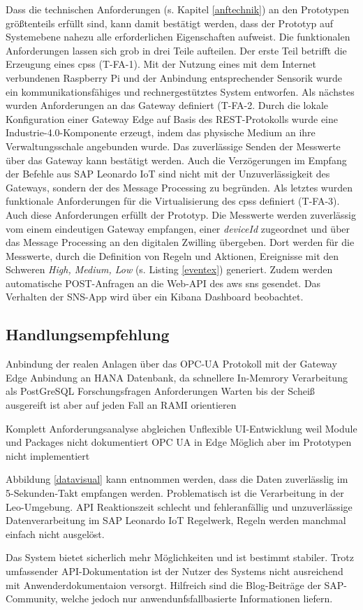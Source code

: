 Dass die technischen Anforderungen (s. Kapitel \ref{anftechnik}) an den Prototypen größtenteils erfüllt sind, kann damit bestätigt werden, dass der Prototyp auf Systemebene nahezu alle erforderlichen Eigenschaften aufweist. Die funktionalen Anforderungen lassen sich grob in drei Teile aufteilen. Der erste Teil betrifft die Erzeugung eines \ac{cpss} (T-FA-1). Mit der Nutzung eines mit dem Internet verbundenen Raspberry Pi und der Anbindung entsprechender Sensorik wurde ein kommunikationsfähiges und rechnergestütztes System entworfen. Als nächstes wurden Anforderungen an das Gateway definiert  (T-FA-2. Durch die lokale Konfiguration einer Gateway Edge auf Basis des REST-Protokolls wurde eine Industrie-4.0-Komponente erzeugt, indem das physische Medium an ihre Verwaltungsschale angebunden wurde. Das zuverlässige Senden der Messwerte über das Gateway kann bestätigt werden. Auch die Verzögerungen im Empfang der Befehle aus SAP Leonardo IoT sind nicht mit der Unzuverlässigkeit des Gateways, sondern der des Message Processing zu begründen. Als letztes wurden funktionale Anforderungen für die Virtualisierung des \ac{cpss} definiert (T-FA-3). Auch diese Anforderungen erfüllt der Prototyp. Die Messwerte werden zuverlässig vom einem eindeutigen Gateway empfangen, einer \textit{deviceId} zugeordnet und über das Message Processing an den digitalen Zwilling übergeben. Dort werden für die Messwerte, durch die Definition von Regeln und Aktionen, Ereignisse mit den Schweren \textit{High, Medium, Low} (s. Listing \ref{eventex}) generiert. Zudem werden automatische POST-Anfragen an die Web-API des \ac{aws} \ac{sns} gesendet. Das Verhalten der SNS-App wird über ein Kibana Dashboard beobachtet.  

\subsection{Handlungsempfehlung}
Anbindung der realen Anlagen über das OPC-UA Protokoll mit der Gateway Edge
Anbindung an HANA Datenbank, da schnellere In-Memrory Verarbeitung als PostGreSQL
Forschungsfragen
Anforderungen
Warten bis der Scheiß ausgereift ist aber auf jeden Fall an RAMI orientieren


Komplett Anforderungsanalyse abgleichen
Unflexible UI-Entwicklung weil Module und Packages nicht dokumentiert
OPC UA in Edge Möglich aber im Prototypen nicht implementiert

Abbildung \ref{datavisual} kann entnommen werden, dass die Daten zuverlässlig im 5-Sekunden-Takt empfangen werden. Problematisch ist die Verarbeitung in der Leo-Umgebung.
API Reaktionszeit schlecht und fehleranfällig und unzuverlässige Datenverarbeitung im SAP Leonardo IoT Regelwerk,
Regeln werden manchmal einfach nicht ausgelöst.


Das System bietet sicherlich mehr Möglichkeiten und ist bestimmt stabiler. Trotz umfassender API-Dokumentation ist der Nutzer des Systems nicht ausreichend mit Anwenderdokumentaion versorgt. Hilfreich sind die Blog-Beiträge der SAP-Community, welche jedoch nur anwendunfsfallbasierte Informationen liefern.
\newpage
